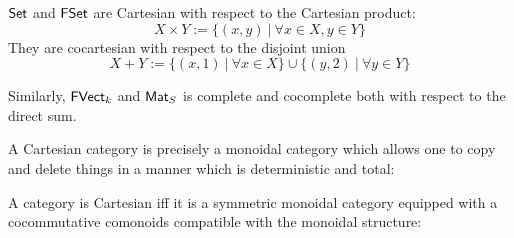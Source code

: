 \begin{example}
$\mathsf{Set}$ and  $\mathsf{FSet}$ are Cartesian with respect to the Cartesian product:
$$X\times Y := \{(x,y) \ | \ \forall x\in X, y \in Y\}$$
They are cocartesian with respect to the disjoint union
$$X+Y := \{ (x,1) \ | \ \forall x \in X \} \cup  \{ (y,2) \ | \ \forall y \in Y \}$$


Similarly, $\mathsf{FVect}_k$ and $\mathsf{Mat}_S$ is complete and cocomplete both with respect to the direct sum.
\end{example}

A Cartesian category is precisely a monoidal category which allows one to copy and delete things in a manner which is deterministic and total:

\begin{lemma}
A category is Cartesian iff it is a symmetric monoidal category equipped with a cocommutative comonoids compatible with the monoidal structure:



\end{lemma}
